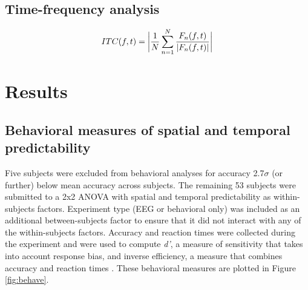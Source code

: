 \documentclass[dwyatte_dissertation.tex]{subfiles}
\begin{document}
\subsection{Time-frequency analysis}

\begin{align*}
ITC(f,t) = \bigg{|}\frac{1}{N} \sum_{n=1}^{N}{\frac{F_n(f,t)}{|F_n(f,t)|}}\bigg{|}
\end{align*}

\section{Results}

\subsection{Behavioral measures of spatial and temporal predictability}

Five subjects were excluded from behavioral analyses for accuracy 2.7$\sigma$ (or further) below mean accuracy across subjects. The remaining 53 subjects were submitted to a 2x2 ANOVA with spatial and temporal predictability as within-subjects factors. Experiment type (EEG or behavioral only) was included as an additional between-subjects factor to ensure that it did not interact with any of the within-subjects factors. Accuracy and reaction times were collected during the experiment and were used to compute \textit{d'}, a measure of sensitivity that takes into account response bias, and inverse efficiency, a measure that combines accuracy and reaction times \cite{TownshendAshby78}. These behavioral measures are plotted in Figure \ref{fig:behave}.
\end{document}

